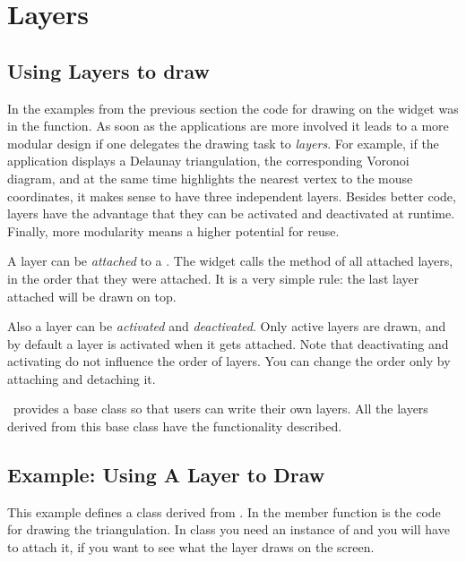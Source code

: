 

\section{Layers}
\label{Qt_widget_layers}
\subsection{Using Layers to draw}

In the examples from the previous section the code for drawing on the
widget was in the  function. As soon as the
applications are more involved it leads to a more modular design if
one delegates the drawing task to {\em layers}. For example, if the
application displays a Delaunay triangulation, the corresponding
Voronoi diagram, and at the same time highlights the nearest vertex to
the mouse coordinates, it makes sense to have three independent
layers. Besides better code, layers have the advantage that they can
be activated and deactivated at runtime. Finally, more modularity
means a higher potential for reuse.

A layer can be {\em attached} to a . The widget calls
the method  of all attached layers, in the
order that they were attached. It is a very simple rule: the last layer
attached will be drawn on top.

Also a layer can be {\em activated} and {\em deactivated}. Only active
layers are drawn, and by default a layer is activated when it gets
attached.  Note that deactivating and activating do not influence the
order of layers. You can change the order only by attaching and
detaching it.


\cgal\ provides a base class so that users can write their own
layers. All the layers derived from this base class
 have the functionality described.


\subsection{Example: Using A Layer to Draw}

This example defines a class derived from
. In the member function 
is the code for drawing the triangulation. In 
class you need an instance of  and you will 
have to attach it, if you want to see what the layer draws on the
screen.

